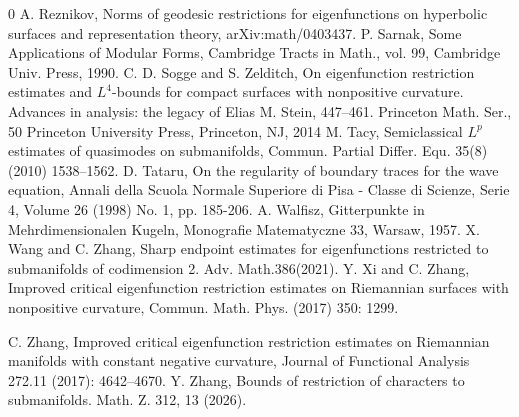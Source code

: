 \documentclass[11pt,reqno]{amsart}
\numberwithin{equation}{section}
\newcommand{\1}{\textbf{1}}
\begin{document}
\begin{thebibliography}{0}
		 A. Reznikov, Norms of geodesic restrictions for eigenfunctions on hyperbolic surfaces and representation theory, arXiv:math/0403437.
		P. Sarnak, Some Applications of Modular Forms, Cambridge Tracts in Math., vol. 99, Cambridge Univ. Press,
		1990.
		C. D. Sogge and S. Zelditch, On eigenfunction restriction estimates and $L^4$-bounds for compact surfaces with nonpositive curvature. Advances in analysis: the legacy of Elias M. Stein, 447--461. Princeton Math. Ser., 50
		Princeton University Press, Princeton, NJ, 2014
		 M. Tacy, Semiclassical $L^p$ estimates of quasimodes on submanifolds, Commun. Partial Differ. Equ. 35(8) (2010) 1538--1562.
		 D. Tataru, On the regularity of boundary traces for the wave equation, Annali della Scuola Normale Superiore di Pisa - Classe di Scienze, Serie 4, Volume 26 (1998) No. 1, pp. 185-206.
		A. Walfisz, Gitterpunkte in Mehrdimensionalen Kugeln, Monografie Matematyczne
		33, Warsaw, 1957.
		X. Wang and C. Zhang, Sharp endpoint estimates for eigenfunctions restricted to submanifolds of codimension 2. Adv. Math.386(2021).
		 Y. Xi and C. Zhang, Improved critical eigenfunction restriction estimates on Riemannian surfaces with nonpositive curvature, Commun. Math. Phys. (2017) 350: 1299.
		
		 C. Zhang, Improved critical eigenfunction restriction estimates on Riemannian manifolds with constant negative curvature, Journal of Functional Analysis 272.11 (2017): 4642--4670.
		Y. Zhang, Bounds of restriction of characters to submanifolds.
		Math. Z. 312, 13 (2026).
		
	\end{thebibliography}
\end{document}
